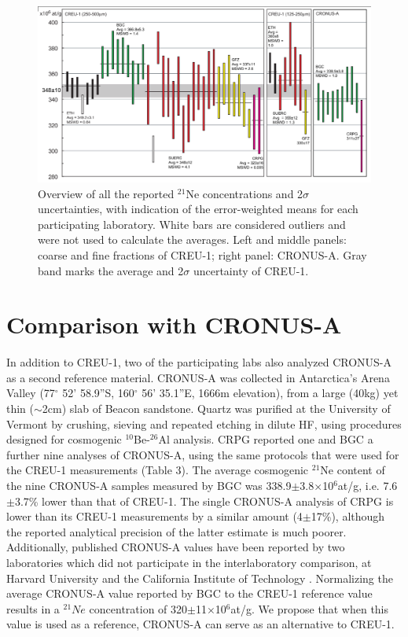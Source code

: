 \documentclass[authoryear,review,12pt]{elsarticle}
\begin{document}
\begin{figure}
\includegraphics[width=500pt]{Figure2.png}
\caption{Overview of all the reported $^{21}$Ne concentrations and
  2$\sigma$ uncertainties, with indication of the error-weighted means
  for each participating laboratory.  White bars are considered
  outliers and were not used to calculate the averages.  Left and
  middle panels: coarse and fine fractions of CREU-1; right panel:
  CRONUS-A.  Gray band marks the average and 2$\sigma$ uncertainty of
  CREU-1.}
\label{fig:average}
\end{figure}

\section{Comparison with CRONUS-A}
\label{sec:cronus-a}

In addition to CREU-1, two of the participating labs also analyzed
CRONUS-A as a second reference material. CRONUS-A was collected in
Antarctica's Arena Valley (77$^\circ$ 52' 58.9''S, 160$^\circ$ 56'
35.1''E, 1666m elevation), from a large (40kg) yet thin ($\sim$2cm)
slab of Beacon sandstone. Quartz was purified at the University of
Vermont by crushing, sieving and repeated etching in dilute HF, using
procedures designed for cosmogenic $^{10}$Be-$^{26}$Al analysis. CRPG
reported one and BGC a further nine analyses of CRONUS-A, using the
same protocols that were used for the CREU-1 measurements (Table 3).
The average cosmogenic $^{21}$Ne content of the nine CRONUS-A samples
measured by BGC was 338.9$\pm$3.8$\times$10$^6$at/g, i.e.
7.6$\pm$3.7\% lower than that of CREU-1. The single CRONUS-A analysis
of CRPG is lower than its CREU-1 measurements by a similar amount
(4$\pm$17\%), although the reported analytical precision of the latter
estimate is much poorer.  Additionally, published CRONUS-A values have
been reported by two laboratories which did not participate in the
interlaboratory comparison, at Harvard University
\citep[330$\pm$3$\times$10$^6$at/g,][]{middleton2012} and the
California Institute of Technology
\citep[338$\pm$10$\times$10$^{6}$at/g,][]{amidon2012}.  Normalizing
the average CRONUS-A value reported by BGC to the CREU-1 reference
value results in a $^{21}Ne$ concentration of
320$\pm$11$\times$10$^6$at/g. We propose that when this value is used
as a reference, CRONUS-A can serve as an alternative to CREU-1.
\end{document}
